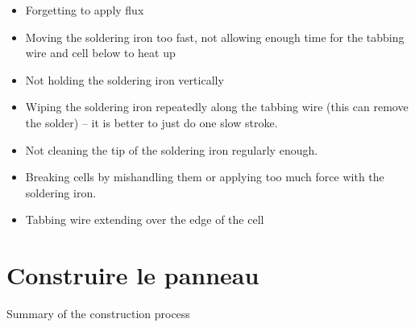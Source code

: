 \documentclass{article}
\theoremstyle{definition}
\theoremstyle{definition}
\theoremstyle{remark}
\begin{document}
    \begin{itemize}
      \item Forgetting to apply flux
      \item Moving the soldering iron too fast, not allowing enough time for the tabbing wire and cell below to heat up
      \item Not holding the soldering iron vertically
      \item Wiping the soldering iron repeatedly along the tabbing wire (this can remove the solder) – it is better to just do one slow stroke.
      \item Not cleaning the tip of the soldering iron regularly enough.
      \item Breaking cells by mishandling them or applying too much force with the soldering iron.
      \item Tabbing wire extending over the edge of the cell
    \end{itemize}
  


\newpage

{\color{blue}\section{Construire le panneau}} %
\label{sec:Construire le panneau Construire le panneau construire_le_panneau}

  Summary of the construction process
\end{document}

